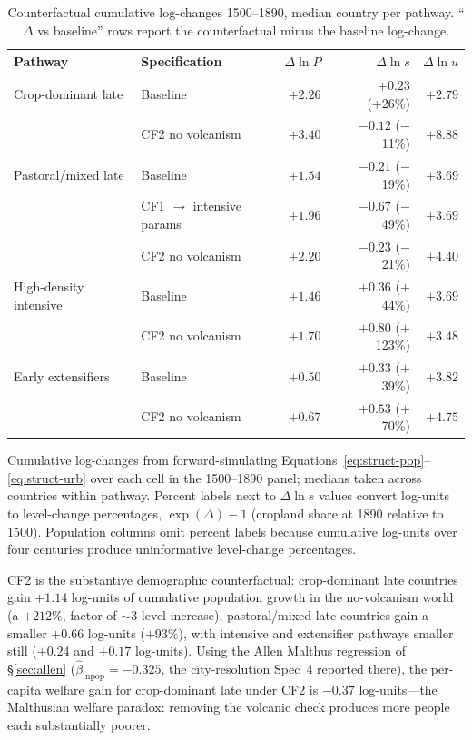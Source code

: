 \documentclass[11pt,letterpaper]{article}
\begin{document}
\begin{table}[H]
\centering
\caption{Counterfactual cumulative log-changes 1500--1890, median country per pathway. ``$\Delta$ vs baseline'' rows report the counterfactual minus the baseline log-change.}
\label{tab:struct-cf}
\small
\begin{tabular}{llrrr}
\toprule
Pathway & Specification & $\Delta \ln P$ & $\Delta \ln s$ & $\Delta \ln u$ \\
\midrule
Crop-dominant late     & Baseline                              & $+2.26$ & $+0.23$ (\!+26\%) & $+2.79$ \\
                        & CF2 no volcanism                     & $+3.40$ & $-0.12$ (\!$-$11\%) & $+8.88$ \\
\midrule
Pastoral/mixed late    & Baseline                              & $+1.54$ & $-0.21$ ($-$19\%) & $+3.69$ \\
                        & CF1 \!$\rightarrow$ intensive params & $+1.96$ & $-0.67$ ($-$49\%) & $+3.69$ \\
                        & CF2 no volcanism                     & $+2.20$ & $-0.23$ ($-$21\%) & $+4.40$ \\
\midrule
High-density intensive & Baseline                              & $+1.46$ & $+0.36$ ($+$44\%) & $+3.69$ \\
                        & CF2 no volcanism                     & $+1.70$ & $+0.80$ ($+$123\%) & $+3.48$ \\
\midrule
Early extensifiers     & Baseline                              & $+0.50$ & $+0.33$ ($+$39\%) & $+3.82$ \\
                        & CF2 no volcanism                     & $+0.67$ & $+0.53$ ($+$70\%) & $+4.75$ \\
\bottomrule
\end{tabular}
\par\smallskip\footnotesize{Cumulative log-changes from forward-simulating Equations~\eqref{eq:struct-pop}--\eqref{eq:struct-urb} over each cell in the 1500--1890 panel; medians taken across countries within pathway. Percent labels next to $\Delta \ln s$ values convert log-units to level-change percentages, $\exp(\Delta)-1$ (cropland share at 1890 relative to 1500). Population columns omit percent labels because cumulative log-units over four centuries produce uninformative level-change percentages.}
\end{table}

CF2 is the substantive demographic counterfactual: crop-dominant late countries gain $+1.14$ log-units of cumulative population growth in the no-volcanism world (a $+212\%$, factor-of-$\sim$3 level increase), pastoral/mixed late countries gain a smaller $+0.66$ log-units ($+93\%$), with intensive and extensifier pathways smaller still ($+0.24$ and $+0.17$ log-units). Using the Allen Malthus regression of \S\ref{sec:allen} ($\hat\beta_{\ln \text{pop}} = -0.325$, the city-resolution Spec~4 reported there), the per-capita welfare gain for crop-dominant late under CF2 is $-0.37$ log-units---the Malthusian welfare paradox: removing the volcanic check produces more people each substantially poorer.
\end{document}
